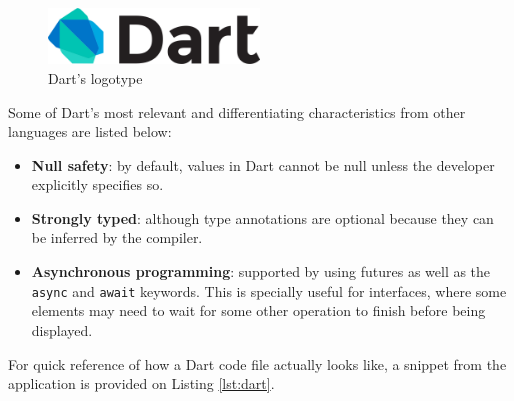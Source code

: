 \begin{figure}[h]
  \centering
  \includegraphics[width=0.5\textwidth]{Figures/dart.png}
  \caption{%
    Dart's logotype
  }
  \label{fig:dart}
\end{figure}

Some of Dart's most relevant and differentiating characteristics from other languages are listed below:

\begin{itemize}
\item \textbf{Null safety}: by default, values in Dart cannot be null unless the developer explicitly specifies so.
\item \textbf{Strongly typed}: although type annotations are optional because they can be inferred by the compiler.
\item \textbf{Asynchronous programming}: supported by using futures as well as the \texttt{async} and \texttt{await} keywords. This is specially useful for interfaces, where some elements may need to wait for some other operation to finish before being displayed.
\end{itemize}

For quick reference of how a Dart code file actually looks like, a snippet from the application is provided on Listing \ref{lst:dart}.


